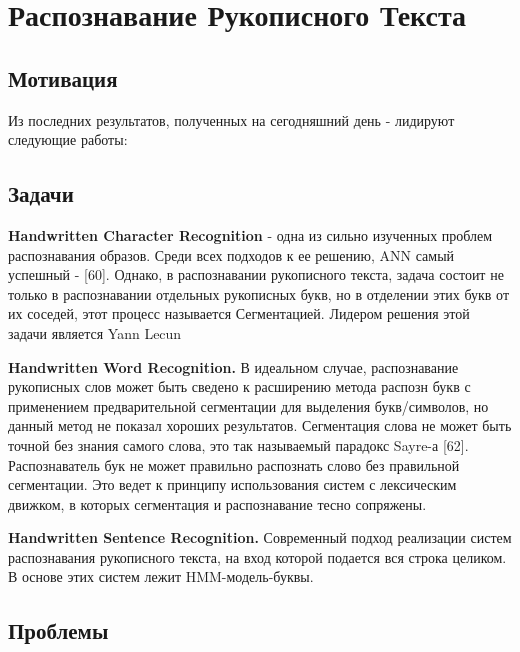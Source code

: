 \chapter{Распознавание Рукописного Текста} \label{chapt2}

\section{Мотивация} \label{sect2_1}

Из последних результатов, полученных на сегодняшний день - лидируют следующие работы:
\cite{graves2009novel}

\cite{espana2011improving, zamora2014neural}

\cite{kozielski2013improvements, frinken2014novel, kozielski2014multilingual, pham2014dropout}

\cite{frinken2011co}


\section{Задачи} \label{sect2_2}


\textbf{Handwritten Character Recognition} - одна из сильно изученных проблем распознавания образов. Среди всех подходов к ее решению, ANN самый успешный - [60]. Однако, в распознавании рукописного текста, задача состоит не только в распознавании отдельных рукописных букв, но в отделении этих букв от их соседей, этот процесс называется Сегментацией.
Лидером решения этой задачи является Yann Lecun

\textbf{Handwritten Word Recognition.} В идеальном случае, распознавание рукописных слов может быть сведено к расширению метода распозн букв с применением предварительной сегментации для выделения букв/символов, но данный метод не показал хороших результатов. Сегментация слова не может быть точной без знания самого слова, это так называемый парадокс Sayre-а [62].  Распознаватель бук не может правильно распознать слово без правильной сегментации. Это ведет к принципу использования систем с лексическим движком, в которых сегментация и распознавание тесно сопряжены.

\textbf{Handwritten Sentence Recognition.} \cite{frinken2014novel} Современный подход реализации систем распознавания рукописного текста, на вход которой подается вся строка целиком. В основе этих систем лежит HMM-модель-буквы.


\section{Проблемы} \label{sect2_3}

